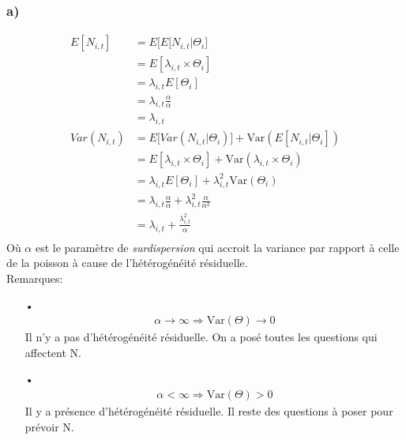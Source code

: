 \subsubsection*{a)}
\begin{align*}
E[N_{i,t}] &= E \Big[E[N_{i,t}|\Theta_i \Big] \\
&= E[\lambda_{i,t} \times \Theta_i]\\
&= \lambda_{i,t}E[\Theta_i] \\
&= \lambda_{i,t} \frac{\alpha}{\alpha}\\
&=\lambda_{i,t} \\
Var(N_{i,t}) &= E\Big[Var(N_{i,t}|\Theta_i )\Big] + \text{Var}(E[N_{i,t}|\Theta_i])\\
&= E[\lambda_{i,t} \times \Theta_i] + \text{Var}(\lambda_{i,t} \times \Theta_i)\\
&= \lambda_{i,t} E[ \Theta_i] + \lambda_{i,t}^2\text{Var}(\Theta_i)\\
&= \lambda_{i,t} \frac{\alpha}{\alpha} + \lambda_{i,t}^2 \frac{\alpha}{\alpha^2}\\
&= \lambda_{i,t}  +  \frac{\lambda_{i,t}^2}{\alpha}\\
\end{align*}
Où $\alpha$ est le paramètre de \emph{surdispersion} qui accroit la variance par rapport à celle de la poisson à cause de l'hétérogénéité résiduelle. 
\\
Remarques:
\begin{itemize}
\item[•] \begin{align*}
\alpha \rightarrow \infty \Rightarrow \text{Var}(\Theta) \rightarrow 0
\end{align*}
Il n'y a pas d'hétérogénéité résiduelle. On a posé toutes les questions qui affectent N.
\\

\item[•] \begin{align*}
\alpha < \infty \Rightarrow \text{Var}(\Theta) > 0
\end{align*}
Il y a présence d'hétérogénéité résiduelle. Il reste des questions à poser pour prévoir N.
\end{itemize}
